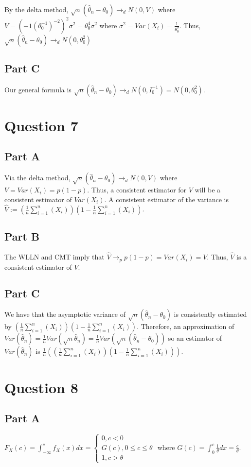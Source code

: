 \documentclass[11pt]{article} %
\begin{document}
By the delta method, $\sqrt{n}(\hat{\theta}_n - \theta_0) \rightarrow_d N(0,V)$ where $V = (-1(\theta_0^{-1})^{-2})^2 \sigma^2 = \theta_0^{4}\sigma^2$ where $\sigma^2 = Var(X_i) =  \frac{1}{\theta_0^2}$. Thus, $\sqrt{n}(\hat{\theta}_n - \theta_0) \rightarrow_d N(0,\theta_0^{2})$
\subsection{Part C}
Our general formula is $\sqrt{n}(\hat{\theta}_n - \theta_0) \rightarrow_d N(0,I_0^{-1}) = N(0,\theta_0^2)$.
\section{Question 7} %
\subsection{Part A}
Via the delta method, $\sqrt{n}(\hat{\theta}_n - \theta_0) \rightarrow_d N(0,V)$ where $V = Var(X_i)= p(1-p).$ Thus, a consistent estimator for $V$ will be a consistent estimator of $Var(X_i).$ A consistent estimator of the variance is $\hat{V} := (\frac{1}{n}\sum_{i=1}^{n}(X_i ))(1-\frac{1}{n}\sum_{i=1}^{n}(X_i ))$.
\subsection{Part B}
The WLLN and CMT imply that $\hat{V} \rightarrow_p p(1-p) = Var(X_i) = V$. Thus, $\hat{V}$ is a consistent estimator of $V$.
\subsection{Part C}
We have that the asymptotic variance of $\sqrt{n}(\hat{\theta}_n - \theta_0)$ is consistently estimated by $(\frac{1}{n}\sum_{i=1}^{n}(X_i ))(1-\frac{1}{n}\sum_{i=1}^{n}(X_i )).$ Therefore, an approximation of $Var(\hat{\theta}_n) =\frac{1}{n}Var(\sqrt{n}\hat{\theta}_n) = \frac{1}{n}Var(\sqrt{n}(\hat{\theta}_n - \theta_0))$ so an estimator of $Var(\hat{\theta}_n)$ is $\frac{1}{n}((\frac{1}{n}\sum_{i=1}^{n}(X_i ))(1-\frac{1}{n}\sum_{i=1}^{n}(X_i ))).$
\section{Question 8} %
\subsection{Part A}
$F_X(c) = \int_{-\infty}^c f_X(x)dx = \begin{cases} 0, c<0 \\ G(c), 0\leq c \leq \theta \\1, c>\theta \end{cases}$ where $G(c) = \int_{0}^c \frac{1}{\theta} dx = \frac{c}{\theta}.$
\end{document}
